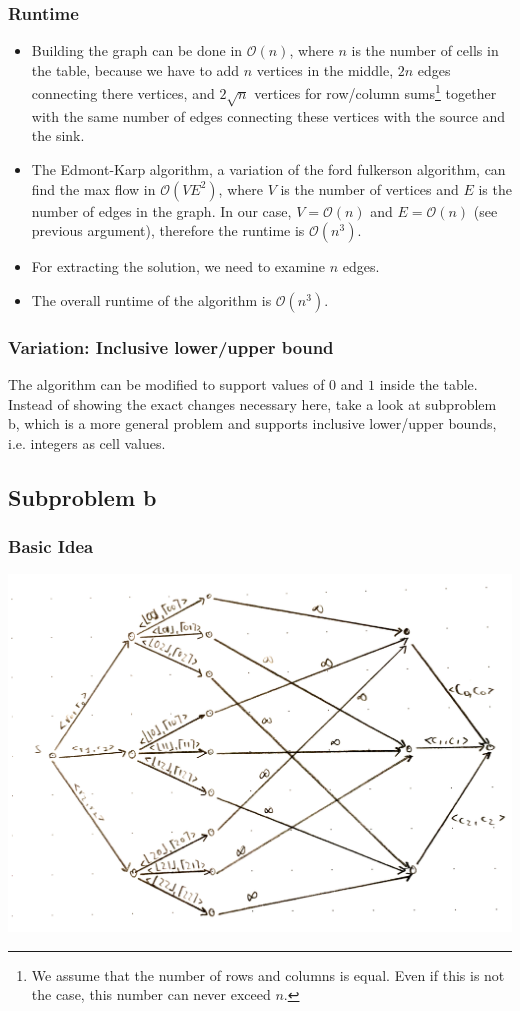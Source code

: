 \documentclass[12pt]{article}
\begin{document}
\subsubsection*{Runtime}
\begin{itemize}
	\item Building the graph can be done in $\mathcal{O}(n)$, where $n$ is the number of cells in the table, because we have to add $n$ vertices in the middle, $2n$ edges connecting there vertices, and $2 \sqrt{n}$ vertices for row/column sums\footnote{We assume that the number of rows and columns is equal. Even if this is not the case, this number can never exceed $n$.} together with the same number of edges connecting these vertices with the source and the sink.
	\item The Edmont-Karp algorithm, a variation of the ford fulkerson algorithm, can find the max flow in $\mathcal{O}(V E^2)$, where $V$ is the number of vertices and $E$ is the number of edges in the graph. In our case, $V = \mathcal{O}(n)$ and $E = \mathcal{O}(n)$ (see previous argument), therefore the runtime is $\mathcal{O}(n^3)$.
	\item For extracting the solution, we need to examine $n$ edges.
	\item The overall runtime of the algorithm is $\mathcal{O}(n^3)$.
\end{itemize}

\subsubsection*{Variation: Inclusive lower/upper bound}
The algorithm can be modified to support values of $0$ and $1$ inside the table. Instead of showing the exact changes necessary here, take a look at subproblem b, which is a more general problem and supports inclusive lower/upper bounds, i.e. integers as cell values.

\subsection*{Subproblem b}
\subsubsection*{Basic Idea}
\includegraphics[width=\textwidth]{3_b.pdf}
\end{document}
